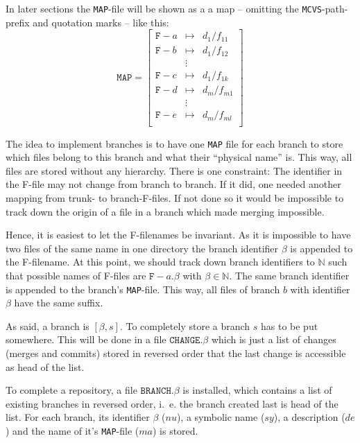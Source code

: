 \documentclass[fleqn, 10pt, a4paper]{article}
\begin{document}
In later sections the \texttt{MAP}-file will be shown as a
a map -- omitting the \texttt{MCVS}-path-prefix and quotation
marks -- like this:
\begin{displaymath}
\mathtt{MAP} =\left[
\begin{array}{lcl}
\mathtt{F-}a &\mapsto& d_1/f_{11} \\
\mathtt{F-}b &\mapsto& d_1/f_{12} \\
             &\vdots & \\
\mathtt{F-}c &\mapsto& d_1/f_{1k} \\
\mathtt{F-}d &\mapsto& d_m/f_{m1} \\
             &\vdots & \\
\mathtt{F-}e &\mapsto& d_m/f_{ml} \\
\end{array}\right]
\end{displaymath}

The idea to implement branches is to have one \texttt{MAP} file
for each branch to store which files belong to this branch and what
their ``physical name'' is. This way, all files are stored without
any hierarchy. There is one constraint: The identifier in the
F-file may not change from branch to branch. If it did, one
needed another mapping from trunk- to branch-F-files. If not done
so it would be impossible to track down the origin of a file in
a branch which made merging impossible.

Hence, it is easiest to let the F-filenames be invariant. As it is
impossible to have two files of the same name in one directory the
branch identifier $\beta$ is appended to the F-filename. At this
point, we should track down branch identifiers to $\mathbb{N}$
such that possible names of F-files are $\mathtt{F-}a\mathtt{.}\beta$
with $\beta\in \mathbb{N}$. The same branch identifier is appended
to the branch's \texttt{MAP}-file. This way, all files of
branch $b$ with identifier $\beta$ have the same suffix.

As said, a branch is $[\beta, s]$. To completely store a branch
$s$ has to be put somewhere. This will be done in a file
$\mathtt{CHANGE}.\beta$ which is just a list of changes (merges
and commits) stored in reversed order that the last change is
accessible as head of the list.

To complete a repository, a file $\mathtt{BRANCH.}\beta$ is installed,
which contains a list of existing branches in reversed order,
i.~e. the branch created last is head of the list.
For each branch, its identifier $\beta$ ($nu$), a symbolic name
($sy$), a description ($de$) and the name of it's
\texttt{MAP}-file ($ma$) is stored.
\end{document}
